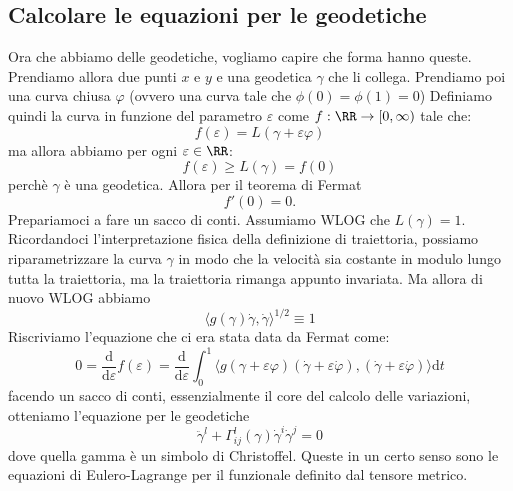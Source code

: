 \documentclass[11pt]{scrartcl}
\newcommand{\dif}{\text{d}}
\begin{document}
	 \subsection{Calcolare le equazioni per le geodetiche}
	 Ora che abbiamo delle geodetiche, vogliamo capire che forma hanno queste. Prendiamo allora due punti $x$ e $y$ e una geodetica $\gamma$ che li collega. Prendiamo poi una curva chiusa $\varphi$ (ovvero una curva tale che $\phi(0)=\phi(1)=0$) Definiamo quindi la curva in funzione del parametro $\varepsilon$ come $f:\RR\to [0,\infty)$ tale che:
	 $$f(\varepsilon)=L(\gamma + \varepsilon \varphi)$$
	 ma allora abbiamo per ogni $\varepsilon\in \RR$:
	 $$f(\varepsilon)\ge L(\gamma)=f(0)$$
	 perchè $\gamma$ è una geodetica. Allora per il teorema di Fermat
	 $$f'(0)=0.$$
	 Prepariamoci a fare un sacco di conti. Assumiamo WLOG che $L(\gamma)=1$. Ricordandoci l'interpretazione fisica della definizione di traiettoria, possiamo riparametrizzare la curva $\gamma$ in modo che la velocità sia costante in modulo lungo tutta la traiettoria, ma la traiettoria rimanga appunto invariata. Ma allora di nuovo WLOG abbiamo
	 $$\langle g(\gamma)\dot{\gamma},\dot{\gamma}\rangle^{1/2}\equiv 1$$
	 Riscriviamo l'equazione che ci era stata data da Fermat come:
	 $$0=\frac{\dif}{\dif \varepsilon}f(\varepsilon)=\frac{\dif}{\dif \varepsilon}\int_{0}^1\langle g(\gamma+\varepsilon\varphi)(\dot{\gamma}+\varepsilon\dot{ \varphi}),(\dot{\gamma}+\varepsilon\dot{ \varphi})\rangle \dif t$$
	 facendo un sacco di conti, essenzialmente il core del calcolo delle variazioni, otteniamo l'equazione per le geodetiche
	 $$\ddot{\gamma}^l+\Gamma^l_{ij}(\gamma)\dot{\gamma}^i\dot{\gamma}^j=0$$
	 dove quella gamma è un simbolo di Christoffel. Queste in un certo senso sono le equazioni di Eulero-Lagrange per il funzionale definito dal tensore metrico. 
\end{document}
